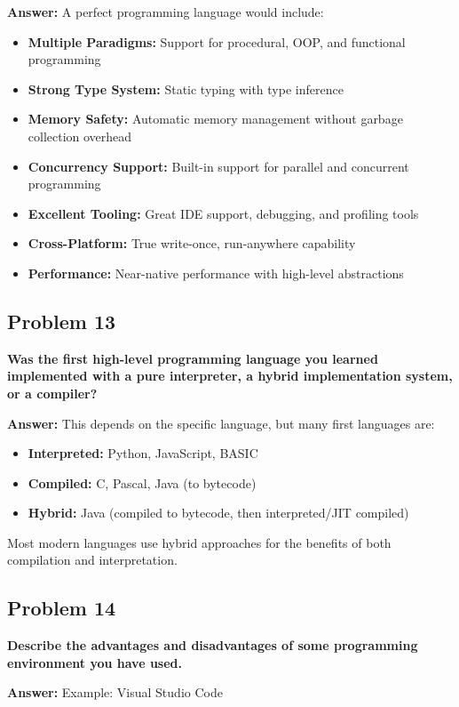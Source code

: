\documentclass[11pt,a4paper]{article}
\begin{document}
\textbf{Answer:}
A perfect programming language would include:

\begin{itemize}
\item \textbf{Multiple Paradigms:} Support for procedural, OOP, and functional programming
\item \textbf{Strong Type System:} Static typing with type inference
\item \textbf{Memory Safety:} Automatic memory management without garbage collection overhead
\item \textbf{Concurrency Support:} Built-in support for parallel and concurrent programming
\item \textbf{Excellent Tooling:} Great IDE support, debugging, and profiling tools
\item \textbf{Cross-Platform:} True write-once, run-anywhere capability
\item \textbf{Performance:} Near-native performance with high-level abstractions
\end{itemize}

\subsection{Problem 13}
\textbf{Was the first high-level programming language you learned implemented with a pure interpreter, a hybrid implementation system, or a compiler?}

\textbf{Answer:}
This depends on the specific language, but many first languages are:

\begin{itemize}
\item \textbf{Interpreted:} Python, JavaScript, BASIC
\item \textbf{Compiled:} C, Pascal, Java (to bytecode)
\item \textbf{Hybrid:} Java (compiled to bytecode, then interpreted/JIT compiled)
\end{itemize}

Most modern languages use hybrid approaches for the benefits of both compilation and interpretation.

\subsection{Problem 14}
\textbf{Describe the advantages and disadvantages of some programming environment you have used.}

\textbf{Answer:}
Example: Visual Studio Code
\end{document}
